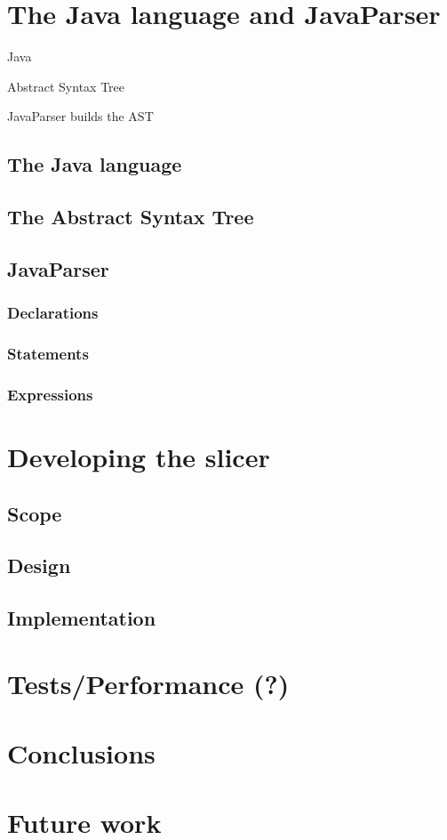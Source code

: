 \documentclass[a4paper]{article}
\begin{document}
\section{The Java language and JavaParser}

Java 

Abstract Syntax Tree

JavaParser builds the AST 

\subsection{The Java language}

\subsection{The Abstract Syntax Tree}

\subsection{JavaParser}

\subsubsection{Declarations}

\subsubsection{Statements}

\subsubsection{Expressions}

\section{Developing the slicer}

\subsection{Scope}

\subsection{Design}

\subsection{Implementation}

\section{Tests/Performance (?)}

\section{Conclusions}

\section{Future work}

\newpage


\end{document}
